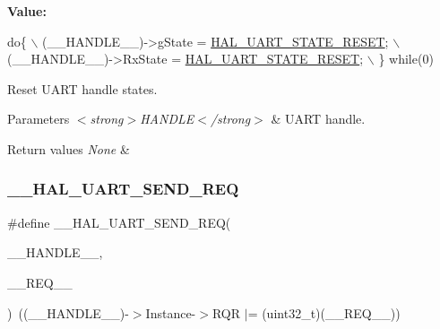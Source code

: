 {\bfseries Value\+:}
\begin{DoxyCode}
\textcolor{keywordflow}{do}\{                                                   \(\backslash\)
                                                       (\_\_HANDLE\_\_)->gState = 
      \hyperlink{group___u_a_r_t___exported___types_ggaf55d844a35379c204c90be5d1e8e50baa9c7d889fce61ccc717228d099a61d113}{HAL\_UART\_STATE\_RESET};      \(\backslash\)
                                                       (\_\_HANDLE\_\_)->RxState = 
      \hyperlink{group___u_a_r_t___exported___types_ggaf55d844a35379c204c90be5d1e8e50baa9c7d889fce61ccc717228d099a61d113}{HAL\_UART\_STATE\_RESET};     \(\backslash\)
                                                     \} \textcolor{keywordflow}{while}(0)
\end{DoxyCode}


Reset U\+A\+RT handle states. 


\begin{DoxyParams}{Parameters}
{\em $<$strong$>$\+H\+A\+N\+D\+L\+E$<$/strong$>$} & U\+A\+RT handle. \\
\hline
\end{DoxyParams}

\begin{DoxyRetVals}{Return values}
{\em None} & \\
\hline
\end{DoxyRetVals}
\mbox{\label{group___u_a_r_t___exported___macros_ga568a15495a9e2a9d230474b9e8bcc8e4}} 
\subsubsection{\texorpdfstring{\+\_\+\+\_\+\+H\+A\+L\+\_\+\+U\+A\+R\+T\+\_\+\+S\+E\+N\+D\+\_\+\+R\+EQ}{\_\_HAL\_UART\_SEND\_REQ}}
{\footnotesize\ttfamily \#define \+\_\+\+\_\+\+H\+A\+L\+\_\+\+U\+A\+R\+T\+\_\+\+S\+E\+N\+D\+\_\+\+R\+EQ(\begin{DoxyParamCaption}\item[{}]{\+\_\+\+\_\+\+H\+A\+N\+D\+L\+E\+\_\+\+\_\+,  }\item[{}]{\+\_\+\+\_\+\+R\+E\+Q\+\_\+\+\_\+ }\end{DoxyParamCaption})~((\+\_\+\+\_\+\+H\+A\+N\+D\+L\+E\+\_\+\+\_\+)-\/$>$Instance-\/$>$R\+QR $\vert$= (uint32\+\_\+t)(\+\_\+\+\_\+\+R\+E\+Q\+\_\+\+\_\+))}



